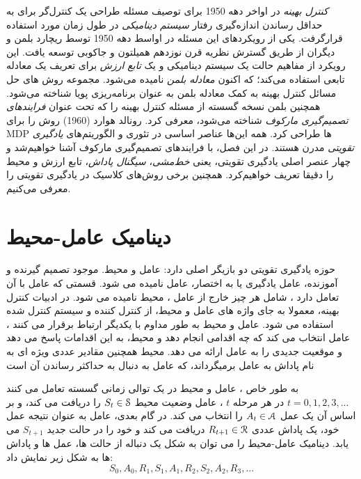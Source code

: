 

 \textit{کنترل بهینه}
در اواخر دهه 1950 برای توصیف مسئله طراحی یک کنترل‌گر برای به حداقل رساندن اندازه‌گیری رفتار \textit{سیستم دینامیکی} در طول زمان مورد استفاده قرارگرفت. یکی از رویکردهای این مسئله در اواسط دهه 1950 توسط ریچارد بلمن و دیگران از طریق گسترش نظریه قرن نوزدهم همیلتون و جاکوبی توسعه یافت. این رویکرد از مفاهیم حالت یک سیستم دینامیکی و یک \textit{تابع ارزش} برای تعریف یک معادله تابعی استفاده می‌کند؛ که اکنون \textit{معادله بلمن} نامیده می‌شود. مجموعه روش های حل مسائل کنترل بهینه به کمک معادله بلمن به عنوان برنامه‌ریزی پویا شناخته می‌شود. همچنین بلمن نسخه گسسته از مسئله کنترل بهینه را که تحت عنوان \textit{فرایندهای تصمیم‌گیری مارکوف} 
 شناخته می‌شود، معرفی کرد. رونالد هوارد (1960) روش
  را برای MDP ها طراحی کرد. همه این‌ها عناصر اساسی در تئوری و الگوریتم‌های \textit{یادگیری تقویتی} مدرن هستند.
  در این فصل، با فرایندهای تصمیم‌گیری مارکوف آشنا خواهیم‌شد و چهار عنصر اصلی یادگیری تقویتی، یعنی \textit{خط‌مشی}، \textit{سیگنال پاداش}، تابع ارزش  و محیط را دقیقا تعریف خواهیم‌کرد. همچنین برخی روش‌های کلاسیک در یادگیری تقویتی را معرفی می‌کنیم.

\section{دینامیک عامل-محیط}
حوزه یادگیری تقویتی  دو بازیگر اصلی دارد: عامل و محیط. موجود تصمیم گیرنده و آموزنده، عامل یادگیری یا به اختصار، عامل نامیده می شود. قسمتی که عامل با آن تعامل دارد ، شامل
هر چیز خارج از عامل ، محیط نامیده می شود.  در ادبیات کنترل بهینه، معمولا به  جای واژه های عامل و محیط، از کنترل کننده و سیستم کنترل شده استفاده می شود.
 عامل و محیط به طور مداوم با یکدیگر ارتباط برقرار می کنند ، عامل انتخاب می کند که چه اقدامی انجام دهد و محیط، به این اقدامات پاسخ می دهد و موقعیت جدیدی را به عامل ارائه می دهد.
محیط همچنین مقادیر عددی ویژه ای به نام پاداش  به عامل برمیگرداند، که عامل به دنبال به حداکثر رساندن آن است

به طور خاص ، عامل و محیط در یک توالی زمانی گسسته تعامل می کنند 
$t = 0,1,2,3,...$
در هر مرحله $t$ ، عامل وضعیت محیط  
$S_t \in \EuScript{S}$
را دریافت می کند، و بر اساس آن یک عمل 
$A_t \in \EuScript{A}$
را انتخاب می کند. در گام بعدی، عامل به عنوان نتیجه عمل خود، یک پاداش عددی $R_{t+1} \in \EuScript{R}$ دریافت می کند و خود را در حالت جدید $S_{t+1}$ می یابد.
دینامیک عامل-محیط را می توان به شکل یک دنباله از حالت ها، عمل ها و پاداش ها به شکل زیر نمایش داد:
$$S_0, A_0, R_1, S_1, A_1, R_2, S_2, A_2, R_3, ...$$

